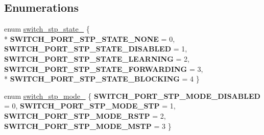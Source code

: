 \subsection*{Enumerations}
\begin{DoxyCompactItemize}
\item 
enum \hyperlink{group__stp_ga6581381a1b134b4d8fe0f963addec7b5}{switch\+\_\+stp\+\_\+state\+\_\+} \{ \\*
{\bfseries S\+W\+I\+T\+C\+H\+\_\+\+P\+O\+R\+T\+\_\+\+S\+T\+P\+\_\+\+S\+T\+A\+T\+E\+\_\+\+N\+O\+N\+E} = 0, 
{\bfseries S\+W\+I\+T\+C\+H\+\_\+\+P\+O\+R\+T\+\_\+\+S\+T\+P\+\_\+\+S\+T\+A\+T\+E\+\_\+\+D\+I\+S\+A\+B\+L\+E\+D} = 1, 
{\bfseries S\+W\+I\+T\+C\+H\+\_\+\+P\+O\+R\+T\+\_\+\+S\+T\+P\+\_\+\+S\+T\+A\+T\+E\+\_\+\+L\+E\+A\+R\+N\+I\+N\+G} = 2, 
{\bfseries S\+W\+I\+T\+C\+H\+\_\+\+P\+O\+R\+T\+\_\+\+S\+T\+P\+\_\+\+S\+T\+A\+T\+E\+\_\+\+F\+O\+R\+W\+A\+R\+D\+I\+N\+G} = 3, 
\\*
{\bfseries S\+W\+I\+T\+C\+H\+\_\+\+P\+O\+R\+T\+\_\+\+S\+T\+P\+\_\+\+S\+T\+A\+T\+E\+\_\+\+B\+L\+O\+C\+K\+I\+N\+G} = 4
 \}
\item 
enum \hyperlink{group__stp_ga8f4ad089a2dadfd52729fb2023e53498}{switch\+\_\+stp\+\_\+mode\+\_\+} \{ {\bfseries S\+W\+I\+T\+C\+H\+\_\+\+P\+O\+R\+T\+\_\+\+S\+T\+P\+\_\+\+M\+O\+D\+E\+\_\+\+D\+I\+S\+A\+B\+L\+E\+D} = 0, 
{\bfseries S\+W\+I\+T\+C\+H\+\_\+\+P\+O\+R\+T\+\_\+\+S\+T\+P\+\_\+\+M\+O\+D\+E\+\_\+\+S\+T\+P} = 1, 
{\bfseries S\+W\+I\+T\+C\+H\+\_\+\+P\+O\+R\+T\+\_\+\+S\+T\+P\+\_\+\+M\+O\+D\+E\+\_\+\+R\+S\+T\+P} = 2, 
{\bfseries S\+W\+I\+T\+C\+H\+\_\+\+P\+O\+R\+T\+\_\+\+S\+T\+P\+\_\+\+M\+O\+D\+E\+\_\+\+M\+S\+T\+P} = 3
 \}
\end{DoxyCompactItemize}
